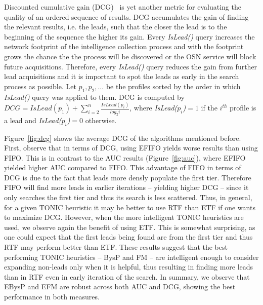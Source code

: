 \documentclass[journal]{IEEEtran}
\newcommand{\islead}[1]{{\em IsLead(#1)}}
\begin{document}
 

Discounted cumulative gain (DCG)~\cite{dcg} is yet another metric for evaluating the quality of an ordered  sequence of results.
DCG accumulates the gain of finding the relevant results, i.e. the leads, such that the closer the lead is to the beginning of the sequence the higher its gain. 
Every \islead{} query increases the network footprint of the intelligence collection process and with the footprint grows the chance the the process will be discovered or the OSN service will block future acquisitions. 
Therefore, every \islead{} query reduces the gain from further lead acquisitions and it is important to spot the leads as early in the search process as possible.
Let \(p_1,p_2,\ldots\) be the profiles sorted by the order in which \islead{} query was applied to them. 
DCG is computed by $DCG=IsLead(p_1)+\sum_{i=2}^n \frac{IsLead(p_i)}{log_2 i}$, where \islead{\(p_i\)}\(=1\) if the $i^{th}$ profile is a lead and \islead{\(p_i\)}\(=0\) otherwise. 

Figure~\ref{fig:dcg} shows the average DCG of the algorithms mentioned before. First, observe that in terms of DCG, using EFIFO yields worse results than using FIFO. This is in contrast to the AUC results (Figure~\ref{fig:auc}), where EFIFO yielded higher AUC compared to FIFO. 
This advantage of FIFO in terms of DCG is due to the fact that leads more densly populate the first tier. Therefore FIFO will find more leads in earlier iterations -- yielding higher DCG -- since it only searches the first tier and thus its search is less scattered. Thus, in general, for a given TONIC heuristic it may be better to use RTF than ETF if one wants to maximize DCG. 
However, when the more intelligent TONIC heuristics are used, we observe again the benefit of using ETF. This is somewhat surprising, as one could expect that the first leads being found are from the first tier and thus RTF may perform better than ETF. These results suggest that the best performing TONIC heuristics -- BysP and FM -- are intelligent enough to consider expanding non-leads only when it is helpful, thus resulting in finding more leads than in RTF even in early iteration of the search. 
In summary, we observe that EBysP and EFM are robust across both AUC and DCG, showing the best performance in both measures. 

\end{document}
